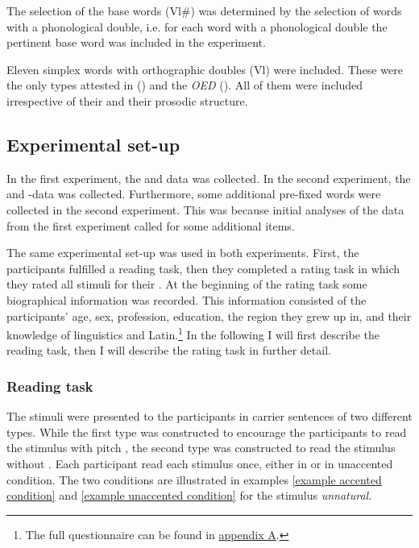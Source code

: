 The selection of the base words (Vl\#) was determined by the selection of words with a phonological double, i.e.  for each word with a phonological double the pertinent base word was included in the experiment. 

Eleven simplex words with orthographic doubles (Vl) were included. These were the only types attested in  (\citealt{Davies.20082014}) and the \textit{OED} (\citealt{OED.2013}). 
All of them were included irrespective of their  and their prosodic structure. 





\subsection{Experimental set-up}

In the first experiment, the  and data was collected.
In the second experiment, the  and -data was collected. Furthermore, some additional pre-fixed words were collected in the second experiment. 
This was because initial analyses of the data from the first experiment called for some additional items.
 
 The same experimental set-up was used in both experiments. First, the participants fulfilled a reading task, then they completed a rating task in which they rated all stimuli for their . 
 At the beginning of the rating task some biographical information was recorded. This information consisted of the participants' age, sex, profession, education, the region they grew up in, and their knowledge of linguistics and Latin.\footnote{The full questionnaire can be found in \hyperref[Appendix A: Decomposability Rating]{appendix A}.}  In the following I will first describe the reading task, then I will describe the rating task in further detail. 

\subsubsection{Reading task}


The stimuli were presented to the participants in carrier sentences of two different types. 
While the first type was constructed to encourage the participants to read the stimulus with pitch , the second type was constructed to read the stimulus without . Each participant read each stimulus once, either in  or in unaccented condition. 
The two conditions are illustrated in examples \ref{example accented condition}  and \ref{example unaccented condition} for the stimulus \textit{unnatural}.  


